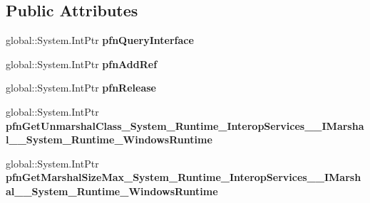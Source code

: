 \subsection*{Public Attributes}
\begin{DoxyCompactItemize}
\item 
\mbox{\label{struct_system_1_1_runtime_1_1_interop_services_1_1_i_marshal_____system___runtime___windows_runtime_____impl_1_1_vtbl_a10273edc8d5316e4cbefddc448a9b7d3}} 
global\+::\+System.\+Int\+Ptr {\bfseries pfn\+Query\+Interface}
\item 
\mbox{\label{struct_system_1_1_runtime_1_1_interop_services_1_1_i_marshal_____system___runtime___windows_runtime_____impl_1_1_vtbl_ac498490d50f27055885b261619d17f54}} 
global\+::\+System.\+Int\+Ptr {\bfseries pfn\+Add\+Ref}
\item 
\mbox{\label{struct_system_1_1_runtime_1_1_interop_services_1_1_i_marshal_____system___runtime___windows_runtime_____impl_1_1_vtbl_affcecfd459725daaba99b11bd92f1ac0}} 
global\+::\+System.\+Int\+Ptr {\bfseries pfn\+Release}
\item 
\mbox{\label{struct_system_1_1_runtime_1_1_interop_services_1_1_i_marshal_____system___runtime___windows_runtime_____impl_1_1_vtbl_a39136623115d8e659149911f823b9fa6}} 
global\+::\+System.\+Int\+Ptr {\bfseries pfn\+Get\+Unmarshal\+Class\+\_\+\+System\+\_\+\+Runtime\+\_\+\+Interop\+Services\+\_\+\+\_\+\+I\+Marshal\+\_\+\+\_\+\+System\+\_\+\+Runtime\+\_\+\+Windows\+Runtime}
\item 
\mbox{\label{struct_system_1_1_runtime_1_1_interop_services_1_1_i_marshal_____system___runtime___windows_runtime_____impl_1_1_vtbl_ab6f6d77272d62f24a8288dc85bab8138}} 
global\+::\+System.\+Int\+Ptr {\bfseries pfn\+Get\+Marshal\+Size\+Max\+\_\+\+System\+\_\+\+Runtime\+\_\+\+Interop\+Services\+\_\+\+\_\+\+I\+Marshal\+\_\+\+\_\+\+System\+\_\+\+Runtime\+\_\+\+Windows\+Runtime}

\end{DoxyCompactItemize}
